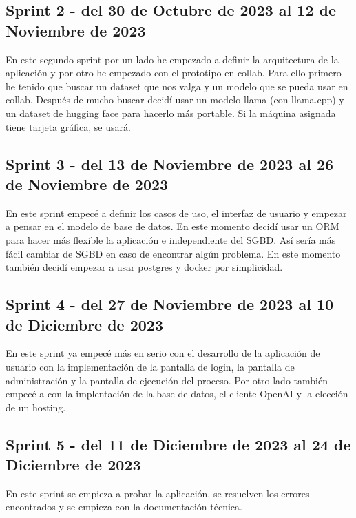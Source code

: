 \subsection{Sprint 2 - del 30 de Octubre de 2023 al 12 de Noviembre de 2023}
En este segundo sprint por un lado he empezado a definir la arquitectura de la aplicación 
y por otro he empezado con el prototipo en collab. Para ello primero he tenido que buscar 
un dataset que nos valga y un modelo que se pueda usar en collab.
Después de mucho buscar decidí usar un modelo llama (con llama.cpp) y un dataset de hugging face 
para hacerlo más portable.
Si la máquina asignada tiene tarjeta gráfica, se usará.

\subsection{Sprint 3 - del 13 de Noviembre de 2023 al 26 de Noviembre de 2023}
En este sprint empecé a definir los casos de uso, el interfaz de usuario y empezar a pensar 
en el modelo de base de datos. En este momento decidí usar un ORM para hacer más flexible la 
aplicación e independiente del SGBD. Así sería más fácil cambiar de SGBD en caso de encontrar 
algún problema. En este momento también decidí empezar a usar postgres y docker por simplicidad.

\subsection{Sprint 4 - del 27 de Noviembre de 2023 al 10 de Diciembre de 2023}
En este sprint ya empecé más en serio con el desarrollo de la aplicación de usuario con
la implementación de la pantalla de login, la pantalla de administración y la pantalla 
de ejecución del proceso.
Por otro lado también empecé a con la implentación de la base de datos, el cliente OpenAI y 
la elección de un hosting.
\subsection{Sprint 5 - del 11 de Diciembre de 2023 al 24 de Diciembre de 2023}
En este sprint se empieza a probar la aplicación, se 
resuelven los errores encontrados y 
se empieza con la documentación técnica.

